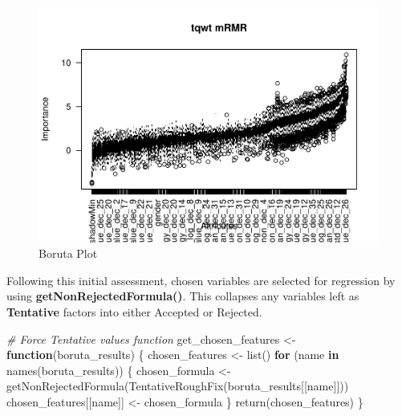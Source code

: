 \documentclass[
]{article}
\newenvironment{Shaded}{\begin{snugshade}}{\end{snugshade}}
\newcommand{\CommentTok}[1]{\textcolor[rgb]{0.56,0.35,0.01}{\textit{#1}}}
\newcommand{\ControlFlowTok}[1]{\textcolor[rgb]{0.13,0.29,0.53}{\textbf{#1}}}
\newcommand{\FunctionTok}[1]{\textcolor[rgb]{0.00,0.00,0.00}{#1}}
\newcommand{\NormalTok}[1]{#1}
\newcommand{\OtherTok}[1]{\textcolor[rgb]{0.56,0.35,0.01}{#1}}
\begin{document}
\begin{landscape}
\begin{figure}
{\centering \includegraphics[width=1\linewidth,height=1\textheight]{figure/borutaPlot-7} 

}

\caption{\label{fig:borutaPlot}Boruta Plot}\label{fig:borutaPlot-7}
\end{figure}

\end{landscape}

\newpage

Following this initial assessment, chosen variables are selected for regression by using \textbf{getNonRejectedFormula()}. This collapses any variables left as \textbf{Tentative} factors into either Accepted or Rejected.

\begin{Shaded}
\begin{Highlighting}[]
\CommentTok{\# Force \textquotesingle{}Tentative\textquotesingle{} values function}
\NormalTok{get\_chosen\_features }\OtherTok{\textless{}{-}} \ControlFlowTok{function}\NormalTok{(boruta\_results) \{}
\NormalTok{    chosen\_features }\OtherTok{\textless{}{-}} \FunctionTok{list}\NormalTok{()}
    \ControlFlowTok{for}\NormalTok{ (name }\ControlFlowTok{in} \FunctionTok{names}\NormalTok{(boruta\_results)) \{}
\NormalTok{        chosen\_formula }\OtherTok{\textless{}{-}} \FunctionTok{getNonRejectedFormula}\NormalTok{(}\FunctionTok{TentativeRoughFix}\NormalTok{(boruta\_results[[name]]))}
\NormalTok{        chosen\_features[[name]] }\OtherTok{\textless{}{-}}\NormalTok{ chosen\_formula}
\NormalTok{    \}}
    \FunctionTok{return}\NormalTok{(chosen\_features)}
\NormalTok{\}}
\end{Highlighting}
\end{Shaded}
\end{document}
